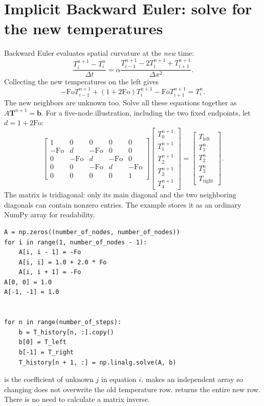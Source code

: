 \documentclass[11pt,letterpaper]{article}
\newcommand{\Fo}{\mathrm{Fo}}
\newcommand{\code}[1]{\texttt{\detokenize{#1}}}
\begin{document}
\section{Implicit Backward Euler: solve for the new temperatures}
Backward Euler evaluates spatial curvature at the \emph{new} time:
\[
 \frac{T_i^{n+1}-T_i^n}{\Delta t}
 =\alpha\frac{T_{i-1}^{n+1}-2T_i^{n+1}+T_{i+1}^{n+1}}{\Delta x^2}.
\]
Collecting the new temperatures on the left gives
\begin{equation}\label{eq:implicit}
 \boxed{-\Fo T_{i-1}^{n+1}+(1+2\Fo)T_i^{n+1}
        -\Fo T_{i+1}^{n+1}=T_i^n.}
\end{equation}
The new neighbors are unknown too. Solve all these equations together as
$A\mathbf T^{n+1}=\mathbf b$. For a five-node illustration, including the
two fixed endpoints, let $d=1+2\Fo$:
\[
\begin{bmatrix}
1&0&0&0&0\\
-\Fo&d&-\Fo&0&0\\
0&-\Fo&d&-\Fo&0\\
0&0&-\Fo&d&-\Fo\\
0&0&0&0&1
\end{bmatrix}
\begin{bmatrix}T_0^{n+1}\\T_1^{n+1}\\T_2^{n+1}\\T_3^{n+1}\\T_4^{n+1}\end{bmatrix}
=\begin{bmatrix}T_{\mathrm{left}}\\T_1^n\\T_2^n\\T_3^n\\T_{\mathrm{right}}\end{bmatrix}.
\]
The matrix is tridiagonal: only its main diagonal and the two neighboring
diagonals can contain nonzero entries. The example stores it as an ordinary
NumPy array for readability.
\begin{lstlisting}
A = np.zeros((number_of_nodes, number_of_nodes))
for i in range(1, number_of_nodes - 1):
    A[i, i - 1] = -Fo
    A[i, i] = 1.0 + 2.0 * Fo
    A[i, i + 1] = -Fo
A[0, 0] = 1.0
A[-1, -1] = 1.0


for n in range(number_of_steps):
    b = T_history[n, :].copy()
    b[0] = T_left
    b[-1] = T_right
    T_history[n + 1, :] = np.linalg.solve(A, b)
\end{lstlisting}
\code{A[i, j]} is the coefficient of unknown $j$ in equation $i$.
\code{copy()} makes an independent array so changing \code{b} does not
overwrite the old temperature row. \code{np.linalg.solve(A, b)} returns
the entire new row. There is no need to calculate a matrix inverse.
\end{document}
